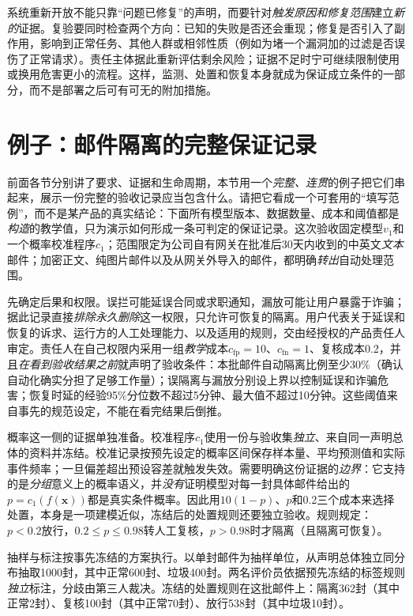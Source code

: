 系统重新开放不能只靠“问题已修复”的声明，而要针对\emph{触发原因和修复范围}建立\emph{新的}证据。复验要同时检查两个方向：已知的失败是否还会重现；修复是否引入了副作用，影响到正常任务、其他人群或相邻性质（例如为堵一个漏洞加的过滤是否误伤了正常请求）。责任主体据此重新评估剩余风险；证据不足时宁可继续限制使用或换用危害更小的流程。这样，监测、处置和恢复本身就成为保证成立条件的一部分，而不是部署之后可有可无的附加措施。

\section{例子：邮件隔离的完整保证记录}
\label{sec:trust-mail-assurance}

前面各节分别讲了要求、证据和生命周期，本节用一个\emph{完整、连贯}的例子把它们串起来，展示一份完整的验收记录应当包含什么。请把它看成一个可套用的“填写范例”，而不是某产品的真实结论：下面所有模型版本、数据数量、成本和阈值都是\emph{构造}的教学值，只为演示如何形成一条可判定的保证记录。这次验收固定模型$v_1$和一个概率校准程序$c_1$；范围限定为公司自有网关在批准后30天内收到的中英文\emph{文本}邮件；加密正文、纯图片邮件以及从网关外导入的邮件，都明确\emph{转出}自动处理范围。

先确定后果和权限。误拦可能延误合同或求职通知，漏放可能让用户暴露于诈骗；据此记录直接\emph{排除永久删除}这一权限，只允许可恢复的隔离。用户代表关于延误和恢复的诉求、运行方的人工处理能力、以及适用的规则，交由经授权的产品责任人审定。责任人在自己权限内采用一组\emph{教学}成本$c_{\mathrm{fp}}=10$、$c_{\mathrm{fn}}=1$、复核成本0.2，并且\emph{在看到验收结果之前}就声明了验收条件：本批邮件自动隔离比例至少30\%（确认自动化确实分担了足够工作量）；误隔离与漏放分别设上界以控制延误和诈骗危害；恢复时延的经验95\%分位数不超过5分钟、最大值不超过10分钟。这些阈值来自事先的规范设定，不能在看完结果后倒推。

概率这一侧的证据单独准备。校准程序$c_1$使用一份与验收集\emph{独立}、来自同一声明总体的资料并冻结。校准记录按预先设定的概率区间保存样本量、平均预测值和实际事件频率；一旦偏差超出预设容差就触发失效。需要明确这份证据的\emph{边界}：它支持的是\emph{分组}意义上的概率语义，并\emph{没有}证明模型对每一封具体邮件给出的$p=c_1(f(\bm x))$都是真实条件概率。因此用$10(1-p)$、$p$和0.2三个成本来选择处置，本身是一项建模近似，冻结后的处置规则还要独立验收。规则规定：$p<0.2$放行，$0.2\leq p\leq0.98$转人工复核，$p>0.98$时才隔离（且隔离可恢复）。

抽样与标注按事先冻结的方案执行。以单封邮件为抽样单位，从声明总体独立同分布抽取1000封，其中正常600封、垃圾400封。两名评价员依据预先冻结的标签规则\emph{独立}标注，分歧由第三人裁决。冻结的处置规则在这批邮件上：隔离362封（其中正常2封）、复核100封（其中正常70封）、放行538封（其中垃圾10封）。

